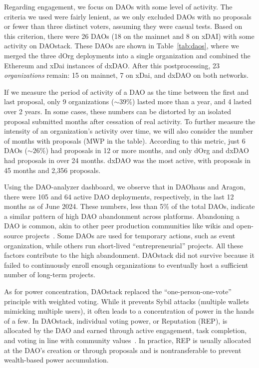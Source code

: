 \documentclass[10pt,lineno]{wlpeerj}
\begin{document}
Regarding engagement, we focus on DAOs with some level of activity. The criteria we used were fairly lenient, as we only excluded DAOs with no proposals or fewer than three distinct voters, assuming they were casual tests. Based on this criterion, there were 26 DAOs (18 on the mainnet and 8 on xDAI) with some activity on DAOstack. These DAOs are shown in Table~\ref{tab:daos}, where we merged the three dOrg deployments into a single organization and combined the Ethereum and xDai instances of dxDAO. After this postprocessing, 23 \emph{organizations} remain: 15 on mainnet, 7 on xDai, and dxDAO on both networks. 

If we measure the period of activity of a DAO as the time between the first and last proposal, only 9 organizations (${\sim}39\%$) lasted more than a year, and 4 lasted over 2 years. In some cases, these numbers can be distorted by an isolated proposal submitted months after cessation of real activity. 
To further measure the intensity of an organization's activity over time, we will also consider the number of months with proposals (MWP in the table). According to this metric, just 6 DAOs (${\sim}26\%$) had proposals in 12 or more months, and only dOrg and dxDAO had proposals in over 24 months. dxDAO was the most active, with proposals in 45 months and 2,356 proposals. 

Using the DAO-analyzer dashboard, we observe that in DAOhaus and Aragon, there were 105 and 64 active DAO deployments, respectively, in the last 12 months as of June 2024. These numbers, less than 5\% of the total DAOs, indicate a similar pattern of high DAO abandonment across platforms.
Abandoning a DAO is common, akin to other peer production communities like wikis and open-source projects~\citep{Kaur_2022}. Some DAOs are used for temporary actions, such as event organization, while others run short-lived ``entrepreneurial'' projects. All these factors contribute to the high abandonment. DAOstack did not survive because it failed to continuously enroll enough organizations to eventually host a sufficient number of long-term projects.

As for power concentration, DAOstack replaced the ``one-person-one-vote'' principle with weighted voting. While it prevents Sybil attacks (multiple wallets mimicking multiple users), it often leads to a concentration of power in the hands of a few. In DAOstack, individual voting power, or Reputation (REP), is allocated by the DAO and earned through active engagement, task completion, and voting in line with community values~\citep{DAOstackWhitepaper1.0}. In practice, REP is usually allocated at the DAO’s creation or through proposals and is nontransferable to prevent wealth-based power accumulation.
\end{document}
